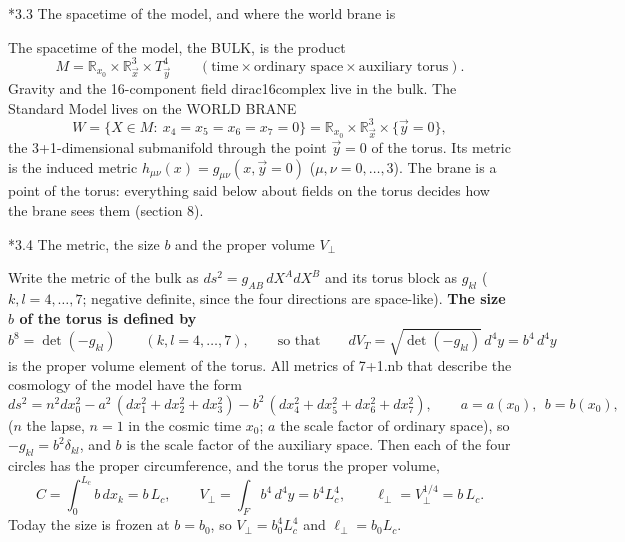 \documentclass[10pt,a4paper]{article}
\makeatletter
\renewcommand\subsection{\@startsection{subsection}{2}{\z@}{-3.25ex\@plus -1ex \@minus -.2ex}{1.5ex \@plus .2ex}{\normalfont\large\bfseries\raggedright}}
\makeatother
\begin{document}
\subsection*{3.3 The spacetime of the model, and where the world brane is}
The spacetime of the model, the BULK, is the product
\begin{equation*}
M=\mathbb R_{x_0}\times\mathbb R^3_{\vec x}\times T^4_{\vec y}\qquad(\text{time}\times\text{ordinary space}\times\text{auxiliary torus}).
\end{equation*}
Gravity and the 16-component field dirac16complex live in the bulk. The Standard Model lives on the WORLD BRANE
\begin{equation*}
W=\{X\in M:\ x_4=x_5=x_6=x_7=0\}=\mathbb R_{x_0}\times\mathbb R^3_{\vec x}\times\{\vec y=0\},
\end{equation*}
the 3+1-dimensional submanifold through the point $\vec y=0$ of the torus. Its metric is the induced metric $h_{\mu\nu}(x)=g_{\mu\nu}(x,\vec y=0)$ ($\mu,\nu=0,\dots,3$). The brane is a point of the torus: everything said below about fields on the torus decides how the brane sees them (section 8).

\subsection*{3.4 The metric, the size \texorpdfstring{$b$}{b} and the proper volume \texorpdfstring{$V_\perp$}{V}}
Write the metric of the bulk as $ds^2=g_{AB}\,dX^AdX^B$ and its torus block as $g_{kl}$ ($k,l=4,\dots,7$; negative definite, since the four directions are space-like). \textbf{The size $b$ of the torus is defined by}
\begin{equation*}
b^8=\det(-g_{kl})\qquad(k,l=4,\dots,7),\qquad\text{so that}\qquad dV_T=\sqrt{\det(-g_{kl})}\,d^4y=b^4\,d^4y
\end{equation*}
is the proper volume element of the torus. All metrics of 7+1.nb that describe the cosmology of the model have the form
\begin{equation*}
ds^2=n^2dx_0^2-a^2\,(dx_1^2+dx_2^2+dx_3^2)-b^2\,(dx_4^2+dx_5^2+dx_6^2+dx_7^2),\qquad a=a(x_0),\ \ b=b(x_0),
\end{equation*}
($n$ the lapse, $n=1$ in the cosmic time $x_0$; $a$ the scale factor of ordinary space), so $-g_{kl}=b^2\delta_{kl}$, and $b$ is the scale factor of the auxiliary space. Then each of the four circles has the proper circumference, and the torus the proper volume,
\begin{equation*}
C=\int_0^{L_c}b\,dx_k=b\,L_c,\qquad V_\perp=\int_F b^4\,d^4y=b^4L_c^4,\qquad \ell_\perp=V_\perp^{1/4}=b\,L_c .
\end{equation*}
Today the size is frozen at $b=b_0$, so $V_\perp=b_0^4L_c^4$ and $\ell_\perp=b_0L_c$.
\end{document}
